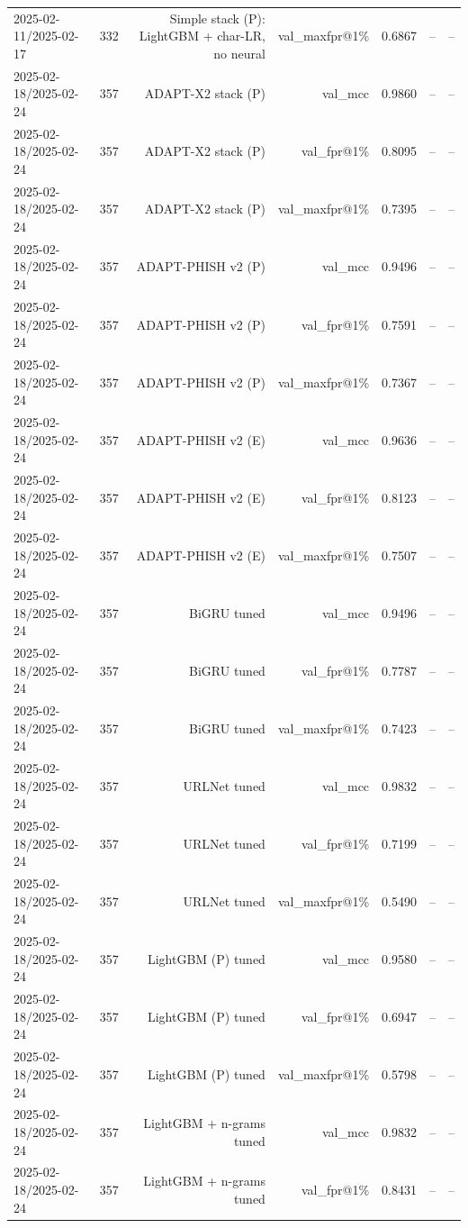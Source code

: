 \begin{table}[t]
\begin{tabular}{llrrrrr}
2025-02-11/2025-02-17 & 332 & Simple stack (P): LightGBM + char-LR, no neural & val\_maxfpr@1\% & 0.6867 & -- & -- \\
2025-02-18/2025-02-24 & 357 & ADAPT-X2 stack (P) & val\_mcc & 0.9860 & -- & -- \\
2025-02-18/2025-02-24 & 357 & ADAPT-X2 stack (P) & val\_fpr@1\% & 0.8095 & -- & -- \\
2025-02-18/2025-02-24 & 357 & ADAPT-X2 stack (P) & val\_maxfpr@1\% & 0.7395 & -- & -- \\
2025-02-18/2025-02-24 & 357 & ADAPT-PHISH v2 (P) & val\_mcc & 0.9496 & -- & -- \\
2025-02-18/2025-02-24 & 357 & ADAPT-PHISH v2 (P) & val\_fpr@1\% & 0.7591 & -- & -- \\
2025-02-18/2025-02-24 & 357 & ADAPT-PHISH v2 (P) & val\_maxfpr@1\% & 0.7367 & -- & -- \\
2025-02-18/2025-02-24 & 357 & ADAPT-PHISH v2 (E) & val\_mcc & 0.9636 & -- & -- \\
2025-02-18/2025-02-24 & 357 & ADAPT-PHISH v2 (E) & val\_fpr@1\% & 0.8123 & -- & -- \\
2025-02-18/2025-02-24 & 357 & ADAPT-PHISH v2 (E) & val\_maxfpr@1\% & 0.7507 & -- & -- \\
2025-02-18/2025-02-24 & 357 & BiGRU tuned & val\_mcc & 0.9496 & -- & -- \\
2025-02-18/2025-02-24 & 357 & BiGRU tuned & val\_fpr@1\% & 0.7787 & -- & -- \\
2025-02-18/2025-02-24 & 357 & BiGRU tuned & val\_maxfpr@1\% & 0.7423 & -- & -- \\
2025-02-18/2025-02-24 & 357 & URLNet tuned & val\_mcc & 0.9832 & -- & -- \\
2025-02-18/2025-02-24 & 357 & URLNet tuned & val\_fpr@1\% & 0.7199 & -- & -- \\
2025-02-18/2025-02-24 & 357 & URLNet tuned & val\_maxfpr@1\% & 0.5490 & -- & -- \\
2025-02-18/2025-02-24 & 357 & LightGBM (P) tuned & val\_mcc & 0.9580 & -- & -- \\
2025-02-18/2025-02-24 & 357 & LightGBM (P) tuned & val\_fpr@1\% & 0.6947 & -- & -- \\
2025-02-18/2025-02-24 & 357 & LightGBM (P) tuned & val\_maxfpr@1\% & 0.5798 & -- & -- \\
2025-02-18/2025-02-24 & 357 & LightGBM + n-grams tuned & val\_mcc & 0.9832 & -- & -- \\
2025-02-18/2025-02-24 & 357 & LightGBM + n-grams tuned & val\_fpr@1\% & 0.8431 & -- & -- \\

\end{tabular}
\end{table}
